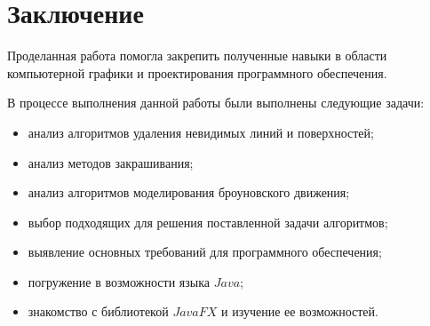 \chapter*{Заключение}

Проделанная работа помогла закрепить полученные навыки в области компьютерной графики и проектирования программного обеспечения.

В процессе выполнения данной работы были выполнены следующие задачи:

\begin{itemize}
	\item анализ алгоритмов удаления невидимых линий и поверхностей;
	\item анализ методов закрашивания;
	\item анализ алгоритмов моделирования броуновского движения;
	\item выбор подходящих для решения поставленной задачи алгоритмов;
	\item выявление основных требований для программного обеспечения;
	\item погружение в возможности языка $Java$;
    \item знакомство с библиотекой $JavaFX$ и изучение ее возможностей.
\end{itemize}
